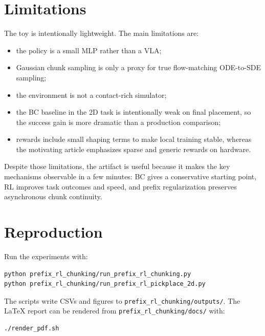 \documentclass[11pt]{article}
\begin{document}
\section{Limitations}

The toy is intentionally lightweight. The main limitations are:
\begin{itemize}[leftmargin=1.5em]
  \item the policy is a small MLP rather than a VLA;
  \item Gaussian chunk sampling is only a proxy for true flow-matching ODE-to-SDE sampling;
  \item the environment is not a contact-rich simulator;
  \item the BC baseline in the 2D task is intentionally weak on final placement, so the success gain is more dramatic than a production comparison;
  \item rewards include small shaping terms to make local training stable, whereas the motivating article emphasizes sparse and generic rewards on hardware.
\end{itemize}

Despite those limitations, the artifact is useful because it makes the key mechanisms observable in a few minutes: BC gives a conservative starting point, RL improves task outcomes and speed, and prefix regularization preserves asynchronous chunk continuity.

\section{Reproduction}

Run the experiments with:
\begin{verbatim}
python prefix_rl_chunking/run_prefix_rl_chunking.py
python prefix_rl_chunking/run_prefix_rl_pickplace_2d.py
\end{verbatim}

The scripts write CSVs and figures to \texttt{prefix\_rl\_chunking/outputs/}. The LaTeX report can be rendered from \texttt{prefix\_rl\_chunking/docs/} with:
\begin{verbatim}
./render_pdf.sh
\end{verbatim}
\end{document}
